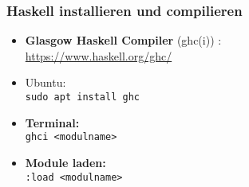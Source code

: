 \documentclass[aspectratio=1610,onlymath, ngerman]{beamer}
\renewcommand{\emph}[1]{\textbf{#1}}
\begin{document}
        
%       
%        
%

    \begin{frame}\frametitle{Haskell installieren und compilieren}
        \begin{itemize}
            \item \emph{Glasgow Haskell Compiler} (ghc(i)) : \\ \url{https://www.haskell.org/ghc/}
            \item Ubuntu: \\
            \texttt{sudo apt install ghc}
            
            \medskip
            
            \item \emph{Terminal:} \\
            \texttt{ghci <modulname>}
            \item \emph{Module laden: } \\
            \texttt{:load <modulname>}
        \end{itemize}
    \end{frame}
\end{document}
